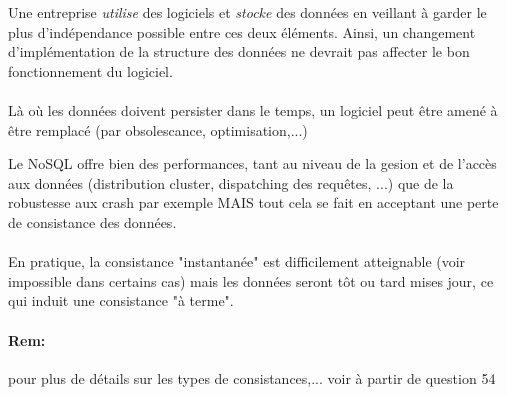 \item{}
{\vrai}
{Une entreprise \textit{utilise} des logiciels et \textit{stocke} des données en veillant à garder le plus d'indépendance possible entre ces deux éléments. Ainsi, un changement d'implémentation de la structure des données ne devrait pas affecter le bon fonctionnement du logiciel.

\paragraph{}
Là où les données doivent persister dans le temps, un logiciel peut être amené à être remplacé (par obsolescance, optimisation,...)
}


\item{}
{\faux}
{}


\item{}
{\vrai}
{Le NoSQL offre bien des performances, tant au niveau de la gesion et de l'accès aux données (distribution cluster, dispatching des requêtes, ...) que de la robustesse aux crash par exemple MAIS tout cela se fait en acceptant une perte de consistance des données.
\paragraph{}
En pratique, la consistance "instantanée" est difficilement atteignable (voir impossible dans certains cas) mais les données seront tôt ou tard mises jour, ce qui induit une consistance "à terme".
\paragraph{Rem:} pour plus de détails sur les types de consistances,... voir à partir de question 54
}


